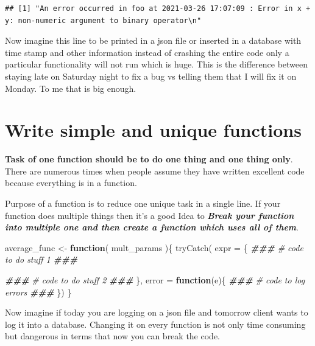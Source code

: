\documentclass[
]{book}
\newenvironment{Shaded}{\begin{snugshade}}{\end{snugshade}}
\newcommand{\AttributeTok}[1]{\textcolor[rgb]{0.77,0.63,0.00}{#1}}
\newcommand{\CommentTok}[1]{\textcolor[rgb]{0.56,0.35,0.01}{\textit{#1}}}
\newcommand{\ControlFlowTok}[1]{\textcolor[rgb]{0.13,0.29,0.53}{\textbf{#1}}}
\newcommand{\DocumentationTok}[1]{\textcolor[rgb]{0.56,0.35,0.01}{\textbf{\textit{#1}}}}
\newcommand{\FunctionTok}[1]{\textcolor[rgb]{0.00,0.00,0.00}{#1}}
\newcommand{\NormalTok}[1]{#1}
\newcommand{\OtherTok}[1]{\textcolor[rgb]{0.56,0.35,0.01}{#1}}
\begin{document}
\begin{verbatim}
## [1] "An error occurred in foo at 2021-03-26 17:07:09 : Error in x + y: non-numeric argument to binary operator\n"
\end{verbatim}

Now imagine this line to be printed in a json file or inserted in a database with time stamp and other information instead of crashing the entire code only a particular functionality will not run which is huge. This is the difference between staying late on Saturday night to fix a bug vs telling them that I will fix it on Monday. To me that is big enough.

\hypertarget{write-simple-and-unique-functions}{%
\section{Write simple and unique functions}\label{write-simple-and-unique-functions}}

\textbf{Task of one function should be to do one thing and one thing only}. There are numerous times when people assume they have written excellent code because everything is in a function.

Purpose of a function is to reduce one unique task in a single line. If your function does multiple things then it's a good Idea to \textbf{\emph{Break your function into multiple one and then create a function which uses all of them}}.

\begin{Shaded}
\begin{Highlighting}[]
\NormalTok{average\_func }\OtherTok{\textless{}{-}} \ControlFlowTok{function}\NormalTok{( mult\_params )\{}
  \FunctionTok{tryCatch}\NormalTok{(}
    \AttributeTok{expr =}\NormalTok{ \{}
      \DocumentationTok{\#\#\#}
      \CommentTok{\# code to do stuff 1}
      \DocumentationTok{\#\#\#}
      
      \DocumentationTok{\#\#\#}
      \CommentTok{\# code to do stuff 2}
      \DocumentationTok{\#\#\#}
\NormalTok{    \},}
    \AttributeTok{error =} \ControlFlowTok{function}\NormalTok{(e)\{}
      \DocumentationTok{\#\#\#}
      \CommentTok{\# code to log errors}
      \DocumentationTok{\#\#\#}
\NormalTok{    \})}
\NormalTok{\}}
\end{Highlighting}
\end{Shaded}

Now imagine if today you are logging on a json file and tomorrow client wants to log it into a database. Changing it on every function is not only time consuming but dangerous in terms that now you can break the code.
\end{document}
